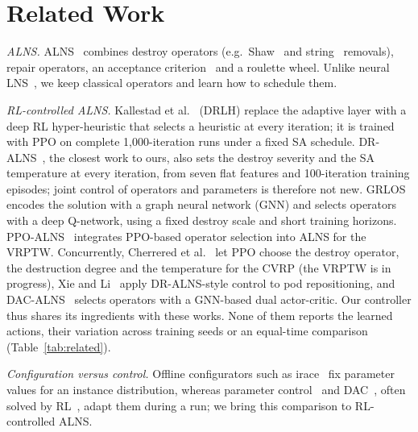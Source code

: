 \section{Related Work}\label{sec:related}
\emph{ALNS.} ALNS~\cite{ropke2006alns,pisinger2007general} combines destroy operators
(e.g.\ Shaw~\cite{shaw1998} and string~\cite{christiaens2020sisr} removals), repair
operators, an acceptance criterion~\cite{santini2018} and a roulette wheel. Unlike
neural LNS~\cite{hottung2020nlns,falkner2022lns}, we keep classical operators and learn
how to schedule them.

\emph{RL-controlled ALNS.}
Kallestad et al.~\cite{kallestad2023} (DRLH) replace the adaptive layer with a deep RL
hyper-heuristic that selects a heuristic at every iteration; it is trained with PPO on
complete 1{,}000-iteration runs under a fixed SA schedule. DR-ALNS~\cite{reijnen2024},
the closest work to ours, also sets the destroy severity and the SA temperature at
every iteration, from seven flat features and 100-iteration training episodes; joint
control of operators and parameters is therefore not new. GRLOS~\cite{johnn2024grlos}
encodes the solution with a graph neural network (GNN) and selects operators with a
deep Q-network, using a fixed destroy scale and short training horizons.
PPO-ALNS~\cite{wang2025ppoalns} integrates PPO-based operator selection into ALNS for
the VRPTW. Concurrently, Cherrered et al.~\cite{cherrered2026roadef} let PPO choose the
destroy operator, the destruction degree and the temperature for the CVRP (the VRPTW is
in progress), Xie and Li~\cite{xie2025pod} apply DR-ALNS-style control to pod
repositioning, and DAC-ALNS~\cite{yu2026dacalns} selects operators with a GNN-based dual
actor-critic. Our controller thus shares its ingredients with these works. None of them reports the learned actions, their variation across
training seeds or an equal-time comparison (Table~\ref{tab:related}).

\emph{Configuration versus control.}
Offline configurators such as irace~\cite{lopez2016irace} fix parameter values for an
instance distribution, whereas parameter control~\cite{eiben1999control} and
DAC~\cite{biedenkapp2020dac,adriaensen2022dac}, often solved by RL~\cite{speck2021dac},
adapt them during a run; we bring this comparison to RL-controlled ALNS.

